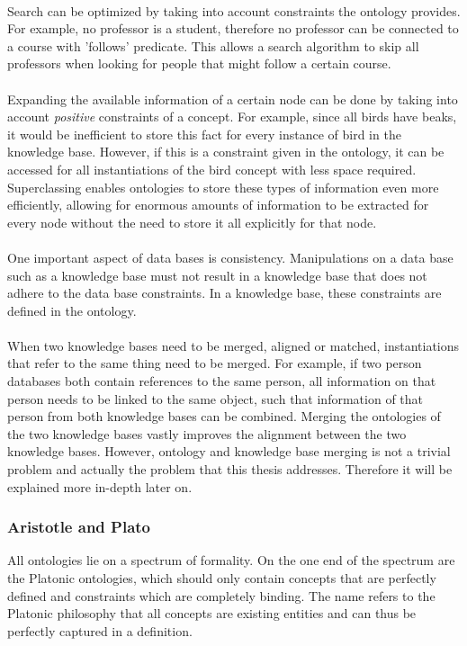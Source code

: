 \documentclass{article}
\begin{document}
 \paragraph{}
 Search can be optimized by taking into account constraints the ontology provides. For example, no professor is a student, therefore no professor can be connected to a course with 'follows' predicate. This allows a search algorithm to skip all professors when looking for people that might follow a certain course.
 \paragraph{}
 Expanding the available information of a certain node can be done by taking into account \textit{positive} constraints of a concept. For example, since all birds have beaks, it would be inefficient to store this fact for every instance of bird in the knowledge base. However, if this is a constraint given in the ontology, it can be accessed for all instantiations of the bird concept with less space required. Superclassing enables ontologies to store these types of information even more efficiently, allowing for enormous amounts of information to be extracted for every node without the need to store it all explicitly for that node.
 \paragraph{}
 One important aspect of data bases is consistency. Manipulations on a data base such as a knowledge base must not result in a knowledge base that does not adhere to the data base constraints. In a knowledge base, these constraints are defined in the ontology.
 \paragraph{}
 When two knowledge bases need to be merged, aligned or matched, instantiations that refer to the same thing need to be merged. For example, if two person databases both contain references to the same person, all information on that person needs to be linked to the same object, such that information of that person from both knowledge bases can be combined. Merging the ontologies of the two knowledge bases vastly improves the alignment between the two knowledge bases. However, ontology and knowledge base merging is not a trivial problem and actually the problem that this thesis addresses. Therefore it will be explained more in-depth later on\cite{09ontology}.
 \subsubsection{Aristotle and Plato}
 All ontologies lie on a spectrum of formality. On the one end of the spectrum are the Platonic ontologies, which should only contain concepts that are perfectly defined and constraints which are completely binding. The name refers to the Platonic philosophy that all concepts are existing entities and can thus be perfectly captured in a definition.
\end{document}
